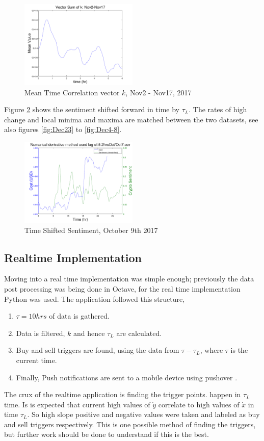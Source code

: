 \documentclass[12pt,journal,compsoc]{IEEEtran}
\begin{document}
\begin{figure}[h]
	\centering
	\includegraphics[width=0.5\textwidth]{../Datasets/Plots/VectorSumk}
	\caption{Mean Time Correlation vector $k$, Nov2 - Nov17, 2017}
	\label{fig:Ksum}
\end{figure}

Figure \ref{fig:SentShift} shows the sentiment shifted forward in time by $\tau_L$. The 
rates of high change and local minima and maxima are matched between the two datasets, see also
figures \ref{fig:Dec23} to \ref{fig:Dec4-8}. 

\begin{figure}[h]
	\centering
	\includegraphics[width=0.5\textwidth]{../Datasets/Plots/Oct7_CostSen}
	\caption{Time Shifted Sentiment, October 9th 2017}
	\label{fig:SentShift}
\end{figure}

\subsection{Realtime Implementation}
Moving into a real time implementation was simple enough; previously the data post processing was being done in Octave, for the 
real time implementation Python was used. The application followed this structure,
\begin{enumerate}
	\item $\tau = 10hrs$ of data is gathered.
	\item Data is filtered, $k$ and hence $\tau_L$ are calculated.
	\item Buy and sell triggers are found, using the data from $\tau - \tau_L$, where $\tau$ is the current time.
	\item Finally, Push notifications are sent to a mobile device using pushover \cite{Pushover}.
\end{enumerate}
The crux of the realtime application is finding the trigger points. 
happen in $\tau_L$ time. 
Is is expected that current high values of $\dot{y}$ correlate to high values of $\dot{x}$ in time $\tau_L$.
So high slope positive and negative values were taken and
labeled as buy and sell triggers respectively. This is one possible method of finding the triggers, but further work
should be done to understand if this is the best.
\end{document}
